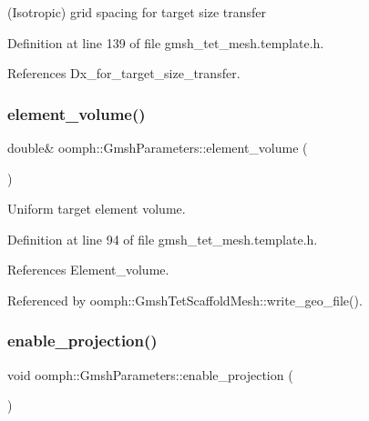 (Isotropic) grid spacing for target size transfer 



Definition at line 139 of file gmsh\+\_\+tet\+\_\+mesh.\+template.\+h.



References Dx\+\_\+for\+\_\+target\+\_\+size\+\_\+transfer.

\mbox{\label{classoomph_1_1GmshParameters_a4c085fa1661d1a27ee95461d275b686f}} 
\subsubsection{\texorpdfstring{element\+\_\+volume()}{element\_volume()}}
{\footnotesize\ttfamily double\& oomph\+::\+Gmsh\+Parameters\+::element\+\_\+volume (\begin{DoxyParamCaption}{ }\end{DoxyParamCaption})\hspace{0.3cm}{\ttfamily [inline]}}



Uniform target element volume. 



Definition at line 94 of file gmsh\+\_\+tet\+\_\+mesh.\+template.\+h.



References Element\+\_\+volume.



Referenced by oomph\+::\+Gmsh\+Tet\+Scaffold\+Mesh\+::write\+\_\+geo\+\_\+file().

\mbox{\label{classoomph_1_1GmshParameters_afa3a44a5a06632733efa49912a272865}} 
\subsubsection{\texorpdfstring{enable\+\_\+projection()}{enable\_projection()}}
{\footnotesize\ttfamily void oomph\+::\+Gmsh\+Parameters\+::enable\+\_\+projection (\begin{DoxyParamCaption}{ }\end{DoxyParamCaption})\hspace{0.3cm}{\ttfamily [inline]}}




